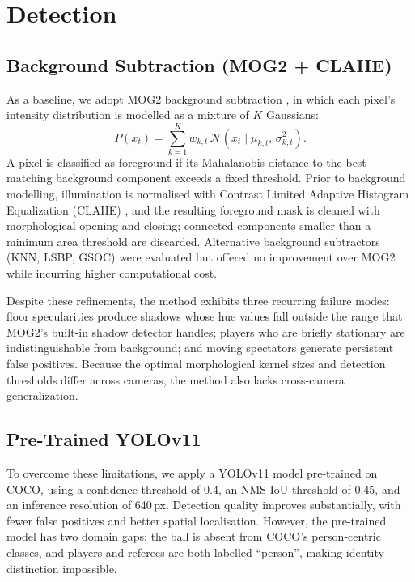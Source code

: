 \section{Detection}\label{sec:detection}

\subsection{Background Subtraction (MOG2 + CLAHE)}
As a baseline, we adopt MOG2 background subtraction \cite{survey}, in which each
pixel's intensity distribution is modelled as a mixture of $K$ Gaussians:
\begin{equation}
  P(x_t) = \sum_{k=1}^{K} w_{k,t}\,\mathcal{N}(x_t \mid \mu_{k,t},\,\sigma_{k,t}^2).
\end{equation}
A pixel is classified as foreground if its Mahalanobis distance to the
best-matching background component exceeds a fixed threshold.
Prior to background modelling, illumination is normalised with Contrast Limited
Adaptive Histogram Equalization (CLAHE) \cite{clahe}, and the resulting foreground
mask is cleaned with morphological opening and closing; connected components smaller
than a minimum area threshold are discarded.
Alternative background subtractors (KNN, LSBP, GSOC) were evaluated but offered no
improvement over MOG2 while incurring higher computational cost.

Despite these refinements, the method exhibits three recurring failure modes: floor
specularities produce shadows whose hue values fall outside the range that MOG2's
built-in shadow detector handles; players who are briefly stationary are
indistinguishable from background; and moving spectators generate persistent false
positives.
Because the optimal morphological kernel sizes and detection thresholds differ
across cameras, the method also lacks cross-camera generalization.

\subsection{Pre-Trained YOLOv11}
To overcome these limitations, we apply a YOLOv11 model \cite{yolo_paper,yolo_github}
pre-trained on COCO, using a confidence threshold of 0.4, an NMS IoU threshold of
0.45, and an inference resolution of 640\,px.
Detection quality improves substantially, with fewer false positives and better
spatial localisation.
However, the pre-trained model has two domain gaps: the ball is absent from COCO's
person-centric classes, and players and referees are both labelled ``person'',
making identity distinction impossible.

